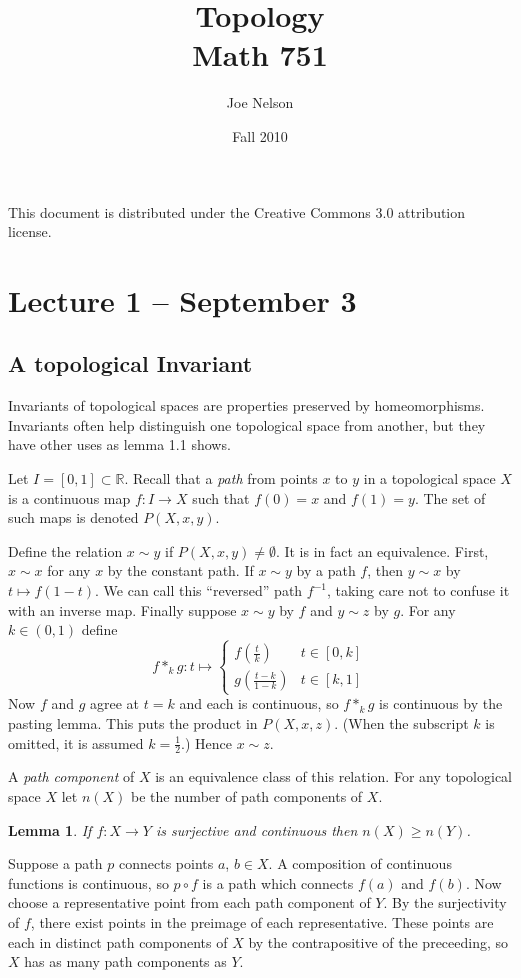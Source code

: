 \documentclass[letterpaper]{article}
\newtheorem{lemma}[theorem]{Lemma}
\newenvironment{proof}[1][Proof]{\begin{trivlist}
\item[\hskip \labelsep {\bfseries #1}]}{\end{trivlist}}
\begin{document}
\title{Topology\\
Math 751}
\author{Joe Nelson}
\date{Fall 2010}
\maketitle

This document is distributed under the Creative Commons 3.0 attribution license.

\section{Lecture 1 -- September 3}

\subsection{A topological Invariant}

Invariants of topological spaces are properties preserved by homeomorphisms. Invariants often help distinguish one topological space from another, but they have other uses as lemma 1.1 shows.

Let $I = [0, 1] \subset \mathbb{R}$. Recall that a \emph{path} from points $x$ to $y$ in a topological space $X$ is a continuous map $f \colon I \rightarrow X$ such that $f(0) = x$ and $f(1) = y$. The set of such maps is denoted $P(X, x, y)$.

Define the relation $x \sim y$ if $P(X, x, y) \ne \emptyset$. It is in fact an equivalence. First, $x \sim x$ for any $x$ by the constant path. If $x \sim y$ by a path $f$, then $y \sim x$ by $t \mapsto f(1-t)$. We can call this ``reversed'' path $f^{-1}$, taking care not to confuse it with an inverse map. Finally suppose $x \sim y$ by $f$ and $y \sim z$ by $g$. For any $k \in (0, 1)$ define
\[ f \ast_k g \colon t \mapsto
   \left\{
     \begin{array}{lr}
       f(\frac{t}{k}) & t \in [0, k]\\
       g(\frac{t-k}{1-k}) & t \in [k, 1]
     \end{array}
   \right.
\]
Now $f$ and $g$ agree at $t = k$ and each is continuous, so $f \ast_k g$ is continuous by the pasting lemma. This puts the product in $P(X, x, z)$. (When the subscript $k$ is omitted, it is assumed $k = \frac{1}{2}$.) Hence $x \sim z$.

A \emph{path component} of $X$ is an equivalence class of this relation. For any topological space $X$ let $n(X)$ be the number of path components of $X$.

\begin{lemma}
If $f \colon X \rightarrow Y$ is surjective and continuous then $n(X) \geq n(Y)$.
\end{lemma}
\begin{proof}
Suppose a path $p$ connects points $a$, $b \in X$. A composition of continuous functions is continuous, so $p \circ f$ is a path which connects $f(a)$ and $f(b)$. Now choose a representative point from each path component of $Y$. By the surjectivity of $f$, there exist points in the preimage of each representative. These points are each in distinct path components of $X$ by the contrapositive of the preceeding, so $X$ has as many path components as $Y$. 
\end{proof}
\end{document}
